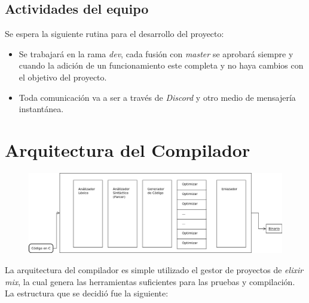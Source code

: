\documentclass{article}
\begin{document}
\subsection{Actividades del equipo}

Se espera la siguiente rutina para el desarrollo del proyecto:

\begin{itemize}
\item Se trabajará en la rama \textit{dev}, cada fusión con \textit{master} se
  aprobará siempre y cuando la adición de un funcionamiento este completa y
  no haya cambios con el objetivo del proyecto.
\item Toda comunicación va a ser a través de \textit{Discord} y otro medio de
  mensajería instantánea.
\end{itemize}

\section{Arquitectura del Compilador}

\begin{figure}[H]
  \centering
  \includegraphics[width=17cm]{../img/Compilador}
\end{figure}

La arquitectura del compilador es simple utilizado el gestor de proyectos de \textit{elixir}
\textit{mix}, la cual genera las herramientas suficientes para las pruebas y compilación. La estructura que se decidió fue la siguiente:
\end{document}
